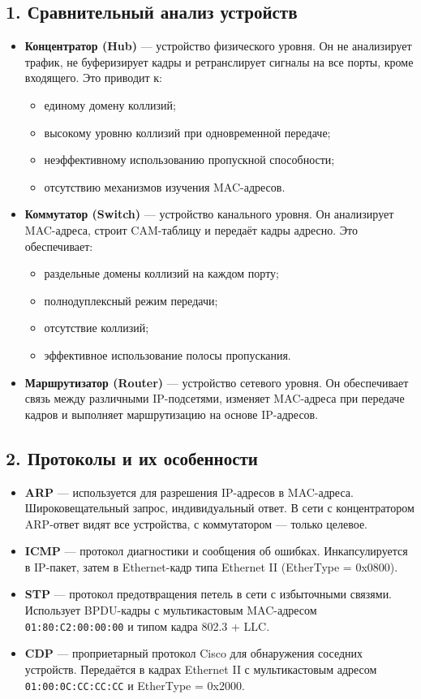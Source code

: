 \subsection*{1. Сравнительный анализ устройств}
\begin{itemize}
    \item \textbf{Концентратор (Hub)} — устройство физического уровня. Он не анализирует трафик, не буферизирует кадры и ретранслирует сигналы на все порты, кроме входящего. Это приводит к:
    \begin{itemize}
        \item единому домену коллизий;
        \item высокому уровню коллизий при одновременной передаче;
        \item неэффективному использованию пропускной способности;
        \item отсутствию механизмов изучения MAC-адресов.
    \end{itemize}
    
    \item \textbf{Коммутатор (Switch)} — устройство канального уровня. Он анализирует MAC-адреса, строит CAM-таблицу и передаёт кадры адресно. Это обеспечивает:
    \begin{itemize}
        \item раздельные домены коллизий на каждом порту;
        \item полнодуплексный режим передачи;
        \item отсутствие коллизий;
        \item эффективное использование полосы пропускания.
    \end{itemize}
    
    \item \textbf{Маршрутизатор (Router)} — устройство сетевого уровня. Он обеспечивает связь между различными IP-подсетями, изменяет MAC-адреса при передаче кадров и выполняет маршрутизацию на основе IP-адресов.
\end{itemize}

\subsection*{2. Протоколы и их особенности}
\begin{itemize}
    \item \textbf{ARP} — используется для разрешения IP-адресов в MAC-адреса. Широковещательный запрос, индивидуальный ответ. В сети с концентратором ARP-ответ видят все устройства, с коммутатором — только целевое.
    \item \textbf{ICMP} — протокол диагностики и сообщения об ошибках. Инкапсулируется в IP-пакет, затем в Ethernet-кадр типа Ethernet II (EtherType = 0x0800).
    \item \textbf{STP} — протокол предотвращения петель в сети с избыточными связями. Использует BPDU-кадры с мультикастовым MAC-адресом \texttt{01:80:C2:00:00:00} и типом кадра 802.3 + LLC.
    \item \textbf{CDP} — проприетарный протокол Cisco для обнаружения соседних устройств. Передаётся в кадрах Ethernet II с мультикастовым адресом \texttt{01:00:0C:CC:CC:CC} и EtherType = 0x2000.
\end{itemize}

